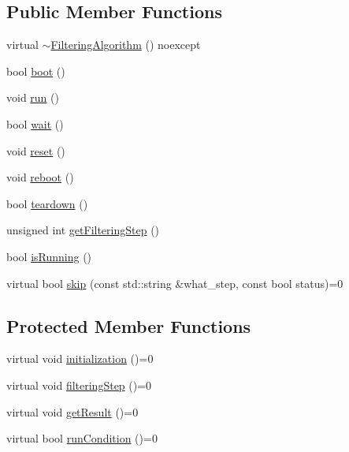 \subsection*{Public Member Functions}
\begin{DoxyCompactItemize}
\item 
virtual \mbox{\hyperlink{classbfl_1_1FilteringAlgorithm_ab286cc00b054717679fb13a3b709b1c4}{$\sim$\+Filtering\+Algorithm}} () noexcept
\item 
bool \mbox{\hyperlink{classbfl_1_1FilteringAlgorithm_a96651f8464190c0a56d79219a1017147}{boot}} ()
\item 
void \mbox{\hyperlink{classbfl_1_1FilteringAlgorithm_a009cbe5f4bbb16967f6c6ddcaed8fbb1}{run}} ()
\item 
bool \mbox{\hyperlink{classbfl_1_1FilteringAlgorithm_a40372c24fa050eb0274371172df0a244}{wait}} ()
\item 
void \mbox{\hyperlink{classbfl_1_1FilteringAlgorithm_a2403c62fbd7bd7f5cda56a84f5f30331}{reset}} ()
\item 
void \mbox{\hyperlink{classbfl_1_1FilteringAlgorithm_a6022859aa985474fb997343cc935b11e}{reboot}} ()
\item 
bool \mbox{\hyperlink{classbfl_1_1FilteringAlgorithm_a1dc912d89ee8f96d4f3e8209865c5308}{teardown}} ()
\item 
unsigned int \mbox{\hyperlink{classbfl_1_1FilteringAlgorithm_a8c43b1f3dac30934c0a03de348d4a29d}{get\+Filtering\+Step}} ()
\item 
bool \mbox{\hyperlink{classbfl_1_1FilteringAlgorithm_a5cfecab2c778620e2557237472bb1721}{is\+Running}} ()
\item 
virtual bool \mbox{\hyperlink{classbfl_1_1FilteringAlgorithm_ac8a718a614905d89d6a43bbbc70d68b2}{skip}} (const std\+::string \&what\+\_\+step, const bool status)=0
\end{DoxyCompactItemize}
\subsection*{Protected Member Functions}
\begin{DoxyCompactItemize}
\item 
virtual void \mbox{\hyperlink{classbfl_1_1FilteringAlgorithm_af2a072aa51407fe5544bdbb7ce466e2a}{initialization}} ()=0
\item 
virtual void \mbox{\hyperlink{classbfl_1_1FilteringAlgorithm_ab3bceb43b5810a4bf1da884b8a0b145a}{filtering\+Step}} ()=0
\item 
virtual void \mbox{\hyperlink{classbfl_1_1FilteringAlgorithm_acdfebf68405a427491e4dd9d020ae09b}{get\+Result}} ()=0
\item 
virtual bool \mbox{\hyperlink{classbfl_1_1FilteringAlgorithm_a5fc12882356f6906b102fbfff2bc4b7c}{run\+Condition}} ()=0
\end{DoxyCompactItemize}
